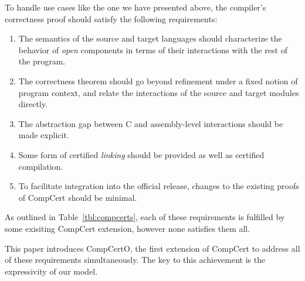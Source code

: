 \documentclass[11pt,oneside,draft]{book}
\theoremstyle{definition}
\begin{document}
To handle use cases like the one we have presented above,
the compiler's correctness proof
should satisfy the following requirements:
\begin{enumerate}
\item \label{req:opensem}
  The semantics of the source and target languages
  should characterize the behavior of \emph{open} components
  in terms of their interactions with the rest of the program.
\item \label{req:opensim}
  The correctness theorem
  should go beyond refinement under a fixed notion of program context, and relate
  the interactions of the source and target modules directly.
\item \label{req:openabs}
  The abstraction gap between C and assembly-level
  interactions should be made explicit.
\item \label{req:linking}
  Some form of certified \emph{linking}
  should be provided as well as certified compilation.
\item \label{req:complexity}
  To facilitate integration into the official release,
  changes to the existing proofs of CompCert
  should be minimal.
\end{enumerate}
As outlined in Table~\ref{tbl:compcerts},
each of these requirements is fulfilled
by some exisiting CompCert extension,
however none satisfies them all.

This paper introduces CompCertO,
the first extension of CompCert to address
all of these requirements simultaneously.
The key to this achievement
is the expressivity of our model.


\end{document}
